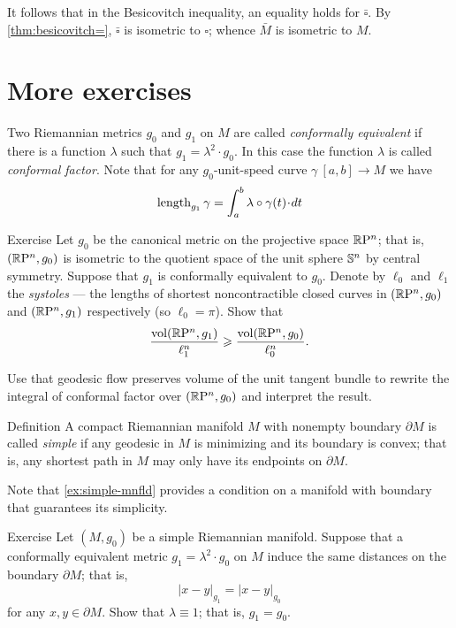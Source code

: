 It follows that in the Besicovitch inequality, an equality holds for $\bar\square$.
By \ref{thm:besicovitch=}, $\bar\square$ is isometric to $\square$;
whence $\bar M$ is isometric to $M$.
\qeds

\section{More exercises}

Two Riemannian metrics $g_0$ and $g_1$ on $M$ are called \emph{conformally equivalent} if there is a function $\lambda$ such that $g_1=\lambda^2\cdot g_0$.
In this case the function $\lambda$ is called \emph{conformal factor}.
Note that for any $g_0$-unit-speed curve $\gamma\:[a,b]\to M$ 
we have
\[\length_{g_1}\gamma=\int_a^b\lambda\circ\gamma(t)\cdot dt\]

\begin{thm}{Exercise}\label{ex:systole=}
Let $g_0$ be the canonical metric on the projective space $\mathbb{R}\mathrm{P}^n$; 
that is, $(\mathbb{R}\mathrm{P}^n,g_0)$ is isometric to the quotient space of the unit sphere $\mathbb{S}^n$ by central symmetry.
Suppose that $g_1$ is conformally equivalent to $g_0$.
Denote by $\ell_0$ and $\ell_1$ the \emph{systoles} --- the lengths of shortest noncontractible closed curves in $(\mathbb{R}\mathrm{P}^n,g_0)$ and $(\mathbb{R}\mathrm{P}^n,g_1)$ respectively (so $\ell_0=\pi$).
Show that 
\[\frac{\operatorname{\rm vol}\nolimits(\mathbb{R}\mathrm{P}^n,g_1)}{\ell_1^n}\geqslant \frac{\operatorname{\rm vol}\nolimits(\mathbb{R}\mathrm{P}^n,g_0)}{\ell_0^n}.\]
\end{thm}

 Use that geodesic flow preserves volume of the unit tangent bundle to rewrite the integral of conformal factor over $(\mathbb{R}\mathrm{P}^n,g_0)$ and interpret the result.

\begin{thm}{Definition}
A compact Riemannian manifold $M$ with nonempty boundary $\partial M$ is called \emph{simple} if any geodesic in $M$ is minimizing and
its boundary is convex;
that is, any shortest path in $M$ may only have its endpoints on $\partial M$.

\end{thm}

Note that \ref{ex:simple-mnfld} provides a condition on a manifold with boundary that guarantees its simplicity.

\begin{thm}{Exercise}\label{ex:conformal}
Let $(M,g_0)$ be a simple Riemannian manifold.
Suppose that a conformally equivalent metric $g_1=\lambda^2\cdot g_0$ on $M$ induce the same distances on the boundary $\partial M$;
that is,
\[|x-y|_{g_1}=|x-y|_{g_0}\]
for any $x,y\in\partial M$.
Show that $\lambda\equiv 1$; that is, $g_1=g_0$.
\end{thm}

